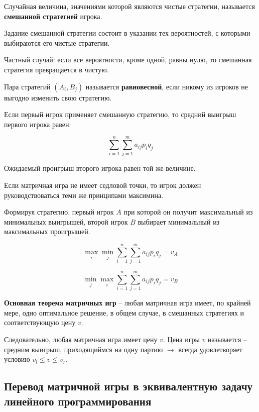 \documentclass[11pt, a4paper]{article}
\begin{document}
    Случайная величина, значениями которой являются чистые стратегии, называется
    \textbf{смешанной стратегией} игрока.

    Задание смешанной стратегии состоит в указании тех вероятностей, с которыми
    выбираются его чистые стратегии.

    Частный случай: если все вероятности, кроме одной, равны нулю, то смешанная стратегия
    превращается в чистую.

    Пара стратегий $(A_i, B_j)$ называется \textbf{равновесной}, если никому из игроков
    не выгодно изменить свою стратегию.

    Если первый игрок применяет смешанную стратегию, то средний выигрыш первого игрока
    равен:

    \begin{equation}
        \sum_{i=1}^n \sum_{j=1}^m a_{ij} p_i q_j\label{eq:equation}
    \end{equation}

    Ожидаемый проигрыш второго игрока равен той же величине.

    Если матричная игра не имеет седловой точки, то игрок должен руководствоваться теми
    же принципами максимина.

    Формируя стратегию, первый игрок $A$ при которой он получит максимальный из минимальных выигрышей,
    второй игрок $B$ выбирает минимальный из максимальных проигрышей.

    \begin{equation}
        \max_{i} \min_{j} \sum_{i=1}^n \sum_{j=1}^m a_{ij} p_i q_j = v_A\label{eq:equation2}
    \end{equation}

    \begin{equation}
        \min_{j} \max_{i} \sum_{i=1}^n \sum_{j=1}^m a_{ij} p_i q_j = v_B\label{eq:equation3}
    \end{equation}

    \textbf{Основная теорема матричных игр} -- любая матричная игра имеет, по крайней мере,
    одно оптимальное решение, в общем случае, в смешанных стратегиях и соответствующую
    цену $v$.


    Следовательно, любая матричная игра имеет цену $v$.
    Цена игры $v$ называется -- средним выигрыш, приходящиймся на одну партию $\rightarrow$
    всегда удовлетворяет условию $v_l \le v \le v_r$.

    \subsection{Перевод матричной игры в эквивалентную задачу линейного программирования}\label{subsec:to_linear_programming}
\end{document}
